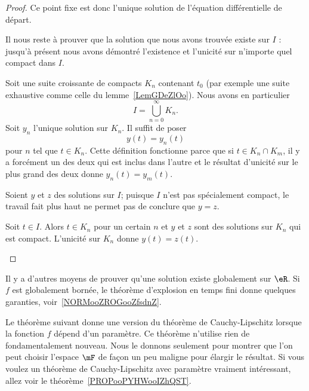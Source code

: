 \begin{proof}
	Ce point fixe est donc l'unique solution de l'équation différentielle de départ.

	\begin{subproof}
		Il nous reste à prouver que la solution que nous avons trouvée existe sur \( I\) : jusqu'à présent nous avons démontré l'existence et l'unicité sur n'importe quel compact dans \( I\).

		Soit une suite croissante de compacts \( K_n\) contenant \( t_0\) (par exemple une suite exhaustive comme celle du lemme~\ref{LemGDeZlOo}). Nous avons en particulier
		\begin{equation}
			I=\bigcup_{n=0}^{\infty}K_n.
		\end{equation}
		Soit \( y_n\) l'unique solution sur \( K_n\). Il suffit de poser
		\begin{equation}
			y(t)=y_n(t)
		\end{equation}
		pour \( n\) tel que \( t\in K_n\). Cette définition fonctionne parce que si \( t\in K_n\cap K_m\), il y a forcément un des deux qui est inclus dans l'autre et le résultat d'unicité sur le plus grand des deux donne \( y_n(t)=y_m(t)\).


		Soient \( y\) et \(z \) des solutions sur \( I\); puisque \( I\) n'est pas spécialement compact, le travail fait plus haut ne permet pas de conclure que \( y=z\).

		Soit \( t\in I\). Alors \( t\in K_n\) pour un certain \( n\) et \( y\) et \( z\) sont des solutions sur \( K_n\) qui est compact. L'unicité sur \( K_n\) donne \( y(t)=z(t)\).
	\end{subproof}
\end{proof}

\begin{normaltext}
	Il y a d'autres moyens de prouver qu'une solution existe globalement sur \( \eR\). Si \( f\) est globalement bornée, le théorème d'explosion en temps fini donne quelques garanties, voir~\ref{NORMooZROGooZfsdnZ}.
\end{normaltext}

Le théorème suivant donne une version du théorème de Cauchy-Lipschitz lorsque la fonction \( f\) dépend d'un paramètre. Ce théorème n'utilise rien de fondamentalement nouveau. Nous le donnons seulement pour montrer que l'on peut choisir l'espace \( \mF\) de façon un peu maligne pour élargir le résultat. Si vous voulez un théorème de Cauchy-Lipschitz avec paramètre vraiment intéressant, allez voir le théorème~\ref{PROPooPYHWooIZhQST}.

